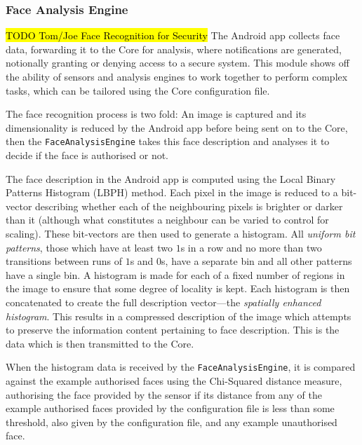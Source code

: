 \documentclass[10pt,a4paper]{article}
\begin{document}

\subsubsection{Face Analysis Engine}
\label{sec:fae}

\hl{TODO Tom/Joe Face Recognition for Security}
The Android app collects face data, forwarding it to the Core for analysis, where notifications are generated, notionally granting or denying access to a secure system. This module shows off the ability of sensors and analysis engines to work together to perform complex tasks, which can be tailored using the Core configuration file.

The face recognition process is two fold: An image is captured and its dimensionality is reduced by the Android app before being sent on to the Core, then the \texttt{FaceAnalysisEngine} takes this face description and analyses it to decide if the face is authorised or not.

The face description in the Android app is computed using the Local Binary Patterns Histogram (LBPH) \cite{ahonen2006face} method. Each pixel in the image is reduced to a bit-vector describing whether each of the neighbouring pixels is brighter or darker than it (although what constitutes a neighbour can be varied to control for scaling). These bit-vectors are then used to generate a histogram. All \emph{uniform bit patterns}, those which have at least two $1$s in a row and no more than two transitions between runs of $1$s and $0$s, have a separate bin and all other patterns have a single bin. A histogram is made for each of a fixed number of regions in the image to ensure that some degree of locality is kept. Each histogram is then concatenated to create the full description vector---the \emph{spatially enhanced histogram}. This results in a compressed description of the image which attempts to preserve the information content pertaining to face description. This is the data which is then transmitted to the Core.

When the histogram data is received by the \texttt{FaceAnalysisEngine}, it is compared against the example authorised faces using the Chi-Squared distance measure, authorising the face provided by the sensor if its distance from any of the example authorised faces provided by the configuration file is less than some threshold, also given by the configuration file, and any example unauthorised face.
\end{document}
